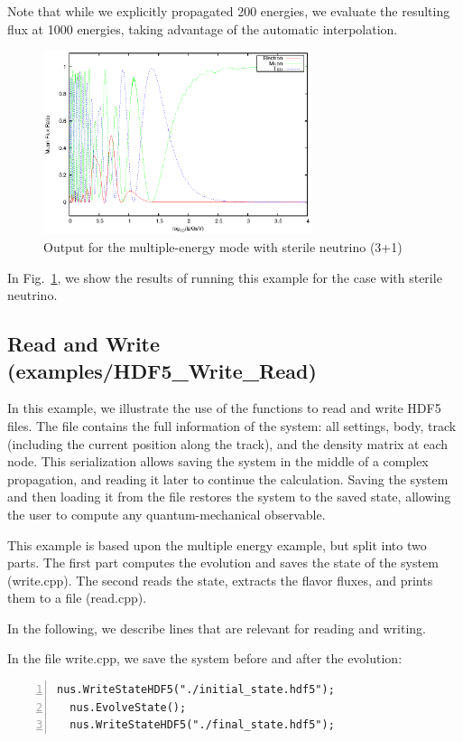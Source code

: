 \documentclass[3p,12pt]{elsarticle}
\newcommand{\ttf}{\ttfamily}
\begin{document}
Note that while we explicitly propagated 200 energies, we evaluate the resulting flux at 1000 energies, taking advantage of the automatic interpolation. 

\begin{figure}[h!]
  \label{fig:multimode}
  \centering
  \includegraphics[width=0.7\textwidth]{fig/Multiplot.eps} 
  \caption{Output for the multiple-energy mode with sterile neutrino (3+1)} 
\end{figure}
 
In Fig.~\ref{fig:multimode}, we show the results of running this example
for the case with sterile neutrino.

\subsection{Read and Write \textnormal{({\ttf examples/HDF5\_Write\_Read})}}
\label{sec:readwrite}
In this example, we illustrate the use of the functions to
read and write {\ttf HDF5} files. The file contains the full
information of the system: all settings, body, track (including the
current position along the track), and the density matrix at each node.
This serialization allows saving the system
in the middle of a complex propagation, and reading it later to continue
the calculation. Saving the system and then loading it from
the file restores the system to the saved state, allowing the user to
compute any quantum-mechanical observable.

This example is based upon the multiple energy example, but
split into two parts. The first part computes the evolution and saves the
state of the system ({\ttf write.cpp}). The second reads the
state, extracts the flavor fluxes, and prints them to a file ({\ttf read.cpp}).

In the following, we describe lines that are relevant for reading and writing.

In the file {\ttf write.cpp}, we save the system before and after the
evolution:
\begin{lstlisting}[frame=leftline, numbers =
  left,breaklines=true,label = ex:sin1]
  nus.WriteStateHDF5("./initial_state.hdf5");
  nus.EvolveState();
  nus.WriteStateHDF5("./final_state.hdf5");
\end{lstlisting}
\end{document}
